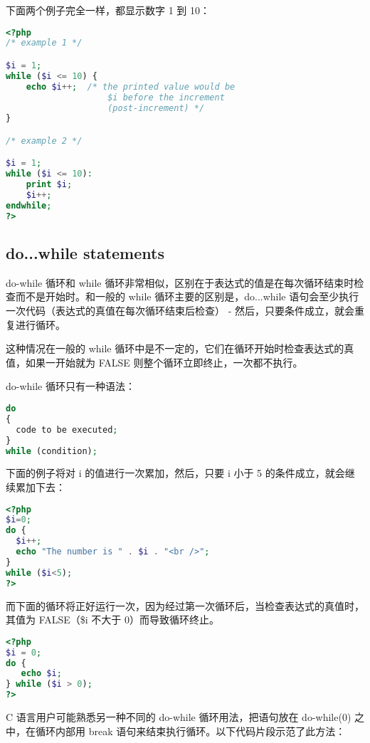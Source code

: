 下面两个例子完全一样，都显示数字 1 到 10：

\begin{lstlisting}[language=PHP]
<?php
/* example 1 */

$i = 1;
while ($i <= 10) {
    echo $i++;  /* the printed value would be
                    $i before the increment
                    (post-increment) */
}

/* example 2 */

$i = 1;
while ($i <= 10):
    print $i;
    $i++;
endwhile;
?>
\end{lstlisting}



\subsection{do...while statements}

do-while 循环和 while 循环非常相似，区别在于表达式的值是在每次循环结束时检查而不是开始时。和一般的 while 循环主要的区别是，do...while 语句会至少执行一次代码（表达式的真值在每次循环结束后检查） - 然后，只要条件成立，就会重复进行循环。

这种情况在一般的 while 循环中是不一定的，它们在循环开始时检查表达式的真值，如果一开始就为 FALSE 则整个循环立即终止，一次都不执行。

do-while 循环只有一种语法：

\begin{lstlisting}[language=PHP]
do
{
  code to be executed;
}
while (condition); 
\end{lstlisting}

下面的例子将对 i 的值进行一次累加，然后，只要 i 小于 5 的条件成立，就会继续累加下去：

\begin{lstlisting}[language=PHP]
<?php 
$i=0;
do {
  $i++;
  echo "The number is " . $i . "<br />";
}
while ($i<5);
?>
\end{lstlisting}

而下面的循环将正好运行一次，因为经过第一次循环后，当检查表达式的真值时，其值为 FALSE（\$i 不大于 0）而导致循环终止。

\begin{lstlisting}[language=PHP]
<?php
$i = 0;
do {
   echo $i;
} while ($i > 0);
?>
\end{lstlisting}


C 语言用户可能熟悉另一种不同的 do-while 循环用法，把语句放在 do-while(0) 之中，在循环内部用 break 语句来结束执行循环。以下代码片段示范了此方法：


